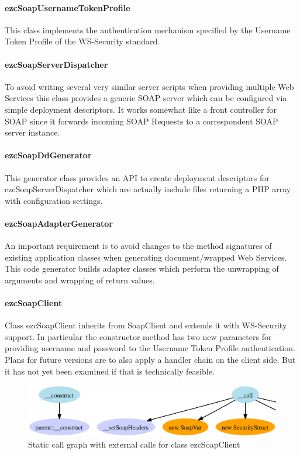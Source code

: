 \documentclass[10pt,final,a4paper,oneside]{article}
\begin{document}
\paragraph{ezcSoapUsernameTokenProfile}
This class implements the authentication mechanism
specified by the Username Token Profile
of the WS-Security standard.

\paragraph{ezcSoapServerDispatcher}
To avoid writing several very similar server scripts
when providing multiple Web Services
this class provides a generic SOAP server which
can be configured via simple deployment descriptors.
It works somewhat like a front controller for SOAP
since it forwards incoming SOAP Requests
to a correspondent SOAP server instance.

\paragraph{ezcSoapDdGenerator}
This generator class provides an API
to create deployment descriptors for
ezcSoapServerDispatcher which are
actually include files returning
a PHP array with configuration settings.

\paragraph{ezcSoapAdapterGenerator}
An important requirement is
to avoid changes to the method signatures
of existing application classes
when generating document/wrapped Web Services.
This code generator builds adapter classes
which perform the unwrapping of arguments
and wrapping of return values.

\paragraph{ezcSoapClient}
Class ezcSoapClient inherits from SoapClient
and extends it with WS-Security support.
In particular the constructor method
has two new parameters for providing username and password
to the Username Token Profile authentication.
Plans for future versions are to
also apply a handler chain on the client side.
But it has not yet been examined
if that is technically feasible.
\begin{figure}[htbp]
	\centering
		\includegraphics[width=1.00\textwidth]{figures/callgraph-SoapClient-class.SecureClient-with-external-calls.ps}
	\caption{Static call graph with external calls for class ezcSoapClient}
	\label{fig:callgraph-SoapClient-class.SecureClient-with-external-calls}
\end{figure}
\end{document}
